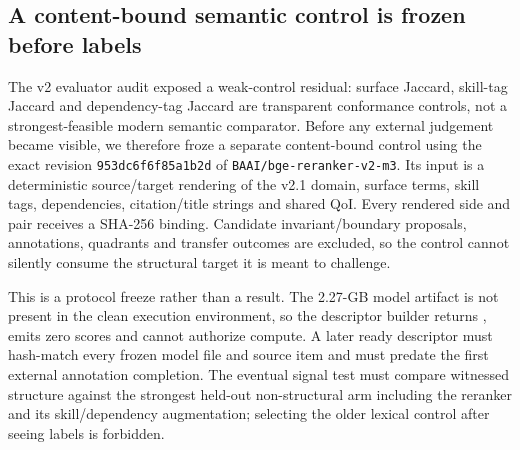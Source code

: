 \subsection{A content-bound semantic control is frozen before labels}

The v2 evaluator audit exposed a weak-control residual: surface Jaccard, skill-tag Jaccard and dependency-tag Jaccard are transparent conformance controls, not a strongest-feasible modern semantic comparator.  Before any external judgement became visible, we therefore froze a separate content-bound control using the exact revision \texttt{953dc6f6f85a1b2d} of \texttt{BAAI/bge-reranker-v2-m3}.  Its input is a deterministic source/target rendering of the v2.1 domain, surface terms, skill tags, dependencies, citation/title strings and shared QoI.  Every rendered side and pair receives a SHA-256 binding.  Candidate invariant/boundary proposals, annotations, quadrants and transfer outcomes are excluded, so the control cannot silently consume the structural target it is meant to challenge.

This is a protocol freeze rather than a result.  The 2.27-GB model artifact is not present in the clean execution environment, so the descriptor builder returns , emits zero scores and cannot authorize compute.  A later ready descriptor must hash-match every frozen model file and source item and must predate the first external annotation completion.  The eventual signal test must compare witnessed structure against the strongest held-out non-structural arm including the reranker and its skill/dependency augmentation; selecting the older lexical control after seeing labels is forbidden.
